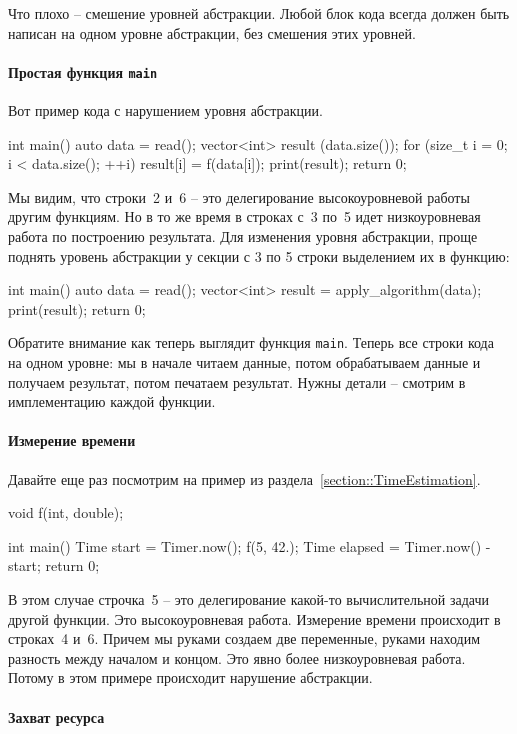 Что плохо -- смешение уровней абстракции.
Любой блок кода всегда должен быть написан на одном уровне абстракции, без смешения этих уровней.

\paragraph{Простая функция \texttt{main}}

Вот пример кода с нарушением уровня абстракции.
\begin{cppcode}
int main() {
  auto data = read();
  vector<int> result (data.size());
  for (size_t i = 0; i < data.size(); ++i)
    result[i] = f(data[i]);
  print(result);
  return 0;
}
\end{cppcode}
Мы видим, что строки~2 и~6 -- это делегирование высокоуровневой работы другим функциям.
Но в то же время в строках с~3 по~5 идет низкоуровневая работа по построению результата.
Для изменения уровня абстракции, проще поднять уровень абстракции у секции с 3 по 5 строки выделением их в функцию:
\begin{cppcode}
int main() {
  auto data = read();
  vector<int> result = apply_algorithm(data);
  print(result);
  return 0;
}
\end{cppcode}
Обратите внимание как теперь выглядит функция \verb"main".
Теперь все строки кода на одном уровне: мы в начале читаем данные, потом обрабатываем данные и получаем результат, потом печатаем результат.
Нужны детали -- смотрим в имплементацию каждой функции.

\paragraph{Измерение времени}

Давайте еще раз посмотрим на пример из раздела~\ref{section::TimeEstimation}.
\begin{cppcode}
void f(int, double);

int main() {
  Time start = Timer.now();
  f(5, 42.);
  Time elapsed = Timer.now() - start;
  return 0;
}
\end{cppcode}
В этом случае строчка~5 -- это делегирование какой-то вычислительной задачи другой функции.
Это высокоуровневая работа.
Измерение времени происходит в строках~4 и~6.
Причем мы руками создаем две переменные, руками находим разность между началом и концом.
Это явно более низкоуровневая работа.
Потому в этом примере происходит нарушение абстракции.

\paragraph{Захват ресурса}

